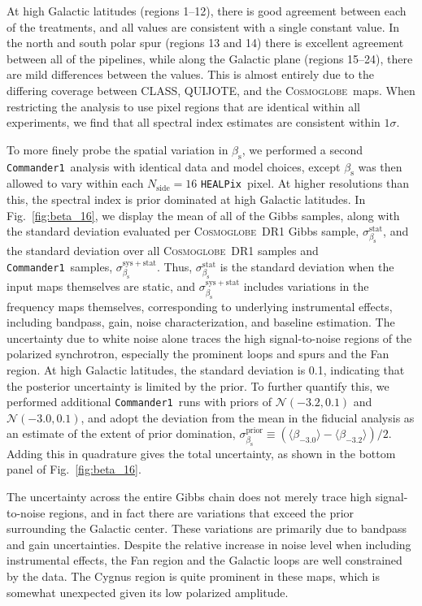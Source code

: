 \documentclass[twocolumn]{../../common/aa}
\def\healpix{\texttt{HEALPix}}
\def\commanderone{\texttt{Commander1}}
\newcommand{\cosmoglobe}{\textsc{Cosmoglobe}}
\begin{document}
At high Galactic latitudes (regions 1--12), there is good agreement between each of the treatments, and all values are consistent with a single constant value. 
In the north and south polar spur (regions 13 and 14) there is excellent agreement between all of the pipelines, while along the Galactic plane (regions 15--24), there are mild differences between the values. This is almost entirely due to the differing coverage between CLASS, QUIJOTE, and the \cosmoglobe\ maps. When restricting the analysis to use pixel regions that are identical within all experiments, we find that all spectral index estimates are consistent within $1\sigma$.

To more finely probe the spatial variation in $\beta_\mathrm s$, we performed a second \commanderone\ analysis with identical data and model choices, except $\beta_\mathrm s$ was then allowed to vary within each $N_\mathrm{side}=16$ \healpix\ pixel. At higher resolutions than this, the spectral index is prior dominated at high Galactic latitudes. In Fig.~\ref{fig:beta_16}, we display the mean of all of the Gibbs samples, along with the standard deviation evaluated per \cosmoglobe\ DR1 Gibbs sample, $\sigma_{\beta_\mathrm s}^\mathrm{stat}$, and the standard deviation over all \cosmoglobe\ DR1 samples and \commanderone\ samples, $\sigma_{\beta_\mathrm s}^\mathrm{sys+stat}$. Thus, $\sigma_{\beta_\mathrm s}^\mathrm{stat}$ is the standard deviation when the input maps themselves are static, and $\sigma_{\beta_\mathrm s}^\mathrm{sys+stat}$ includes variations in the frequency maps themselves, corresponding to underlying instrumental effects, including bandpass, gain, noise characterization, and baseline estimation. The uncertainty due to white noise alone traces the high signal-to-noise regions of the polarized synchrotron, especially the prominent loops and spurs and the Fan region. At high Galactic latitudes, the standard deviation is 0.1, indicating that the posterior uncertainty is limited by the prior. To further quantify this, we performed additional \commanderone\ runs with priors of $\mathcal N(-3.2,0.1)$ and $\mathcal N(-3.0,0.1)$, and adopt the deviation from the mean in the fiducial analysis as an estimate of the extent of prior domination, $\sigma_{\beta_\mathrm s}^\mathrm{prior}\equiv (\langle \beta_{-3.0}\rangle-\langle\beta_{-3.2}\rangle)/2$. Adding this in quadrature gives the total uncertainty, as shown in the bottom panel of Fig.~\ref{fig:beta_16}.

The uncertainty across the entire Gibbs chain does not merely trace high signal-to-noise regions, and in fact there are variations that exceed the prior surrounding the Galactic center. These variations are primarily due to bandpass and gain uncertainties. Despite the relative increase in noise level when including instrumental effects, the Fan region and the Galactic loops are well constrained by the data. The Cygnus region is quite prominent in these maps, which is somewhat unexpected given its low polarized amplitude.
\end{document}
